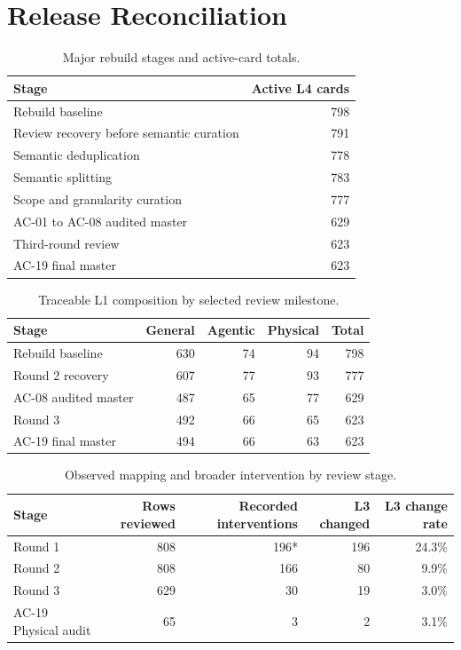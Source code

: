 \documentclass[10pt,a4paper]{article}
\begin{document}
\section{Release Reconciliation}

\begin{table}[H]
\centering
\caption{Major rebuild stages and active-card totals.}
\begin{tabular}{lr}
\toprule
Stage & Active L4 cards \\
\midrule
Rebuild baseline & 798 \\
Review recovery before semantic curation & 791 \\
Semantic deduplication & 778 \\
Semantic splitting & 783 \\
Scope and granularity curation & 777 \\
AC-01 to AC-08 audited master & 629 \\
Third-round review & 623 \\
AC-19 final master & 623 \\
\bottomrule
\end{tabular}
\end{table}

\begin{table}[H]
\centering
\caption{Traceable L1 composition by selected review milestone.}
\label{tab:domain-stages}
\begin{tabular}{lrrrr}
\toprule
Stage & General & Agentic & Physical & Total \\
\midrule
Rebuild baseline & 630 & 74 & 94 & 798 \\
Round 2 recovery & 607 & 77 & 93 & 777 \\
AC-08 audited master & 487 & 65 & 77 & 629 \\
Round 3 & 492 & 66 & 65 & 623 \\
AC-19 final master & 494 & 66 & 63 & 623 \\
\bottomrule
\end{tabular}
\end{table}

\begin{table}[H]
\centering
\caption{Observed mapping and broader intervention by review stage.}
\label{tab:intervention-stages}
\begin{tabular}{lrrrr}
\toprule
Stage & Rows reviewed & Recorded interventions & L3 changed & L3 change rate \\
\midrule
Round 1 & 808 & 196* & 196 & 24.3\% \\
Round 2 & 808 & 166 & 80 & 9.9\% \\
Round 3 & 629 & 30 & 19 & 3.0\% \\
AC-19 Physical audit & 65 & 3 & 2 & 3.1\% \\
\bottomrule
\end{tabular}
\end{table}
\end{document}
